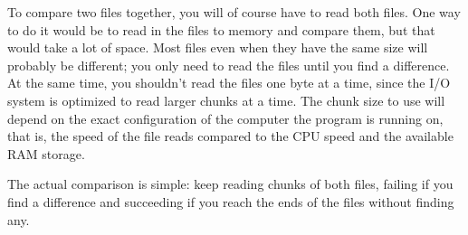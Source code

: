 
To compare two files together, you will of course have to read both
files. One way to do it would be to read in the files to memory and
compare them, but that would take a lot of space. Most files even when
they have the same size will probably be different; you only need to
read the files until you find a difference. At the same time, you
shouldn't read the files one byte at a time, since the
I/O system is optimized to read larger chunks at a time. The chunk size
to use will depend on the exact configuration of the computer the
program is running on, that is, the speed of the file reads compared to
the CPU speed and the available RAM storage. 

The actual comparison is simple: keep reading chunks of both files,
failing if you find a difference and succeeding if you reach the ends
of the files without finding any. 

